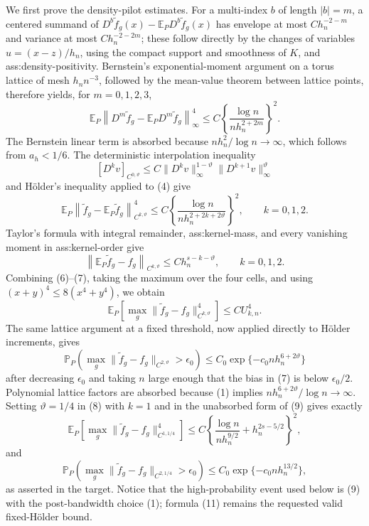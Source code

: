 We first prove the density-pilot estimates.  For a multi-index \(b\) of length \(|b|=m\), a centered summand of
\(D^b\widetilde f_g(x)-\mathbb E_PD^b\widetilde f_g(x)\) has envelope at most
\(C h_n^{-2-m}\) and variance at most \(C h_n^{-2-2m}\); these follow directly by the changes of variables
\(u=(x-z)/h_n\), using the compact support and smoothness of \(K\), and ass:density-positivity.  Bernstein's exponential-moment argument on a torus lattice of mesh \(h_n n^{-3}\), followed by the mean-value theorem between lattice points, therefore yields, for \(m=0,1,2,3\),
\[
 \mathbb E_P\left\|D^m\widetilde f_g-
       \mathbb E_PD^m\widetilde f_g\right\|_\infty^4
 \leq C\left\{\frac{\log n}{n h_n^{2+2m}}\right\}^{2}.
\tag{4}
\]
The Bernstein linear term is absorbed because
\(n h_n^2/\log n\to\infty\), which follows from \(a_h<1/6\).  The deterministic interpolation inequality
\[
 [D^k v]_{C^{0,\vartheta}}
 \leq C\|D^k v\|_\infty^{1-\vartheta}
          \|D^{k+1}v\|_\infty^{\vartheta}
\tag{5}
\]
and H\"older's inequality applied to (4) give
\[
 \mathbb E_P\left\|\widetilde f_g-\mathbb E_P\widetilde f_g
                   \right\|_{C^{k,\vartheta}}^4
 \leq C\left\{\frac{\log n}
 {n h_n^{2+2k+2\vartheta}}\right\}^{2},
 \qquad k=0,1,2.
\tag{6}
\]
Taylor's formula with integral remainder, ass:kernel-mass, and every vanishing moment in ass:kernel-order give
\[
 \left\|\mathbb E_P\widetilde f_g-f_g\right\|_{C^{k,\vartheta}}
 \leq C h_n^{s-k-\vartheta},
 \qquad k=0,1,2.
\tag{7}
\]
Combining (6)--(7), taking the maximum over the four cells, and using
\((x+y)^4\leq8(x^4+y^4)\), we obtain
\[
 \mathbb E_P\left[\max_g
 \|\widetilde f_g-f_g\|_{C^{k,\vartheta}}^4\right]
 \leq C U_{k,n}^4.
\tag{8}
\]
The same lattice argument at a fixed threshold, now applied directly to H\"older increments, gives
\[
 \mathbb P_P\left(\max_g
 \|\widetilde f_g-f_g\|_{C^{2,\vartheta}}>\epsilon_0\right)
 \leq C_0\exp\{-c_0n h_n^{6+2\vartheta}\}
\tag{9}
\]
after decreasing \(\epsilon_0\) and taking \(n\) large enough that the bias in (7) is below \(\epsilon_0/2\).  Polynomial lattice factors are absorbed because (1) implies
\(n h_n^{6+2\vartheta}/\log n\to\infty\).  Setting \(\vartheta=1/4\) in (8) with \(k=1\) and in the unabsorbed form of (9) gives exactly
\[
 \mathbb E_P\left[\max_g
 \|\widetilde f_g-f_g\|_{C^{1,1/4}}^4\right]
 \leq C\left\{\frac{\log n}{n h_n^{9/2}}
                  +h_n^{2s-5/2}\right\}^{2},
\tag{10}
\]
and
\[
 \mathbb P_P\left(\max_g
 \|\widetilde f_g-f_g\|_{C^{2,1/4}}>\epsilon_0\right)
 \leq C_0\exp\{-c_0n h_n^{13/2}\},
\tag{11}
\]
as asserted in the target.  Notice that the high-probability event used below is (9) with the post-bandwidth choice (1); formula (11) remains the requested valid fixed-H\"older bound.

